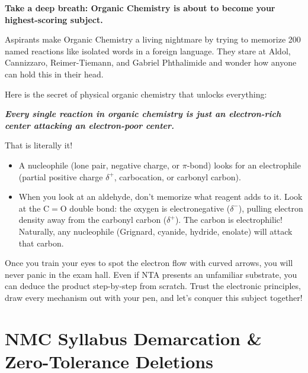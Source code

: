 \documentclass[10pt,twoside,openright]{book}
\begin{document}
\begin{mentorbox}
\textbf{Take a deep breath: Organic Chemistry is about to become your highest-scoring subject.}

Aspirants make Organic Chemistry a living nightmare by trying to memorize 200 named reactions like isolated words in a foreign language. They stare at Aldol, Cannizzaro, Reimer-Tiemann, and Gabriel Phthalimide and wonder how anyone can hold this in their head.

Here is the secret of physical organic chemistry that unlocks everything:
\begin{center}
  \textbf{\textit{Every single reaction in organic chemistry is just an electron-rich center attacking an electron-poor center.}}
\end{center}

That is literally it! 
\begin{itemize}[leftmargin=*]
  \item A nucleophile (lone pair, negative charge, or $\pi$-bond) looks for an electrophile (partial positive charge $\delta^+$, carbocation, or carbonyl carbon).
  \item When you look at an aldehyde, don't memorize what reagent adds to it. Look at the $\mathrm{C=O}$ double bond: the oxygen is electronegative ($\delta^-$), pulling electron density away from the carbonyl carbon ($\delta^+$). The carbon is electrophilic! Naturally, any nucleophile (Grignard, cyanide, hydride, enolate) will attack that carbon.
\end{itemize}

Once you train your eyes to spot the electron flow with curved arrows, you will never panic in the exam hall. Even if NTA presents an unfamiliar substrate, you can deduce the product step-by-step from scratch. Trust the electronic principles, draw every mechanism out with your pen, and let's conquer this subject together!
\end{mentorbox}

\section{NMC Syllabus Demarcation \& Zero-Tolerance Deletions}
\end{document}
